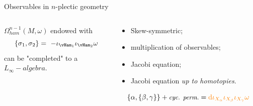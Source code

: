 \documentclass[handout,10pt]{beamer}
\begin{document}
\begin{frame}{Observables in $n$-plectic geometry}
    \pause
    \vfill
        \begin{columns}[T]
          \pause
          \setlength{\belowdisplayskip}{5pt}
          \begin{column}{.50\linewidth}
            \vspace{-1em}
            \begin{thmblock}
              $\Omega^{n-1}_{ham}(M,\omega)$ endowed with
              \vspace{-.5em}
              \begin{displaymath}
                \lbrace \sigma_1, \sigma_2 \rbrace =
                ~ - \iota_{\vHam_1}\iota_{\vHam_2} \omega
              \end{displaymath}
    can be "completed" to a \\ $L_\infty-algebra$.
            \end{thmblock}
          \end{column}
    \pause
          \begin{column}{.50\linewidth}
            \begin{itemize}
              \item[\cmark] Skew-symmetric;
              \item[\xmark] multiplication of observables;
              \item[\xmark] Jacobi equation;
              \item[\smark] Jacobi equation \emph{up to homotopies}.
            \end{itemize}
    \[
    \small
    \{\alpha,\{\beta,\gamma\}\} + \text{\it cyc. perm.}
    = {\color{orange}\mathrm{d} \iota_{X_\alpha} \iota_{X_\beta} \iota_{X_\gamma}\omega}
    \]
          \end{column}
        \end{columns}

\end{frame}
\end{document}
